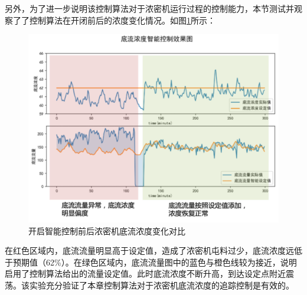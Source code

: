 另外，为了进一步说明该控制算法对于浓密机运行过程的控制能力，本节测试并观察了了控制算法在开闭前后的浓度变化情况。如图\ref{fig:actual}所示：

\begin{figure}[htb]
  \centering
  \includegraphics[width=\linewidth]{figures/chapter6/actual.png}
  \caption{开启智能控制前后浓密机底流浓度变化对比}
  \label{fig:actual}
\end{figure}
在红色区域内，底流流量明显高于设定值，造成了浓密机屯料过少，底流浓度远低于预期值（62\%）。在绿色区域内，底流流量图中的蓝色与橙色线较为接近，说明启用了控制算法给出的流量设定值。此时底流浓度不断升高，到达设定点附近震荡。该实验充分验证了本章控制算法对于浓密机底流浓度的追踪控制是有效的。












